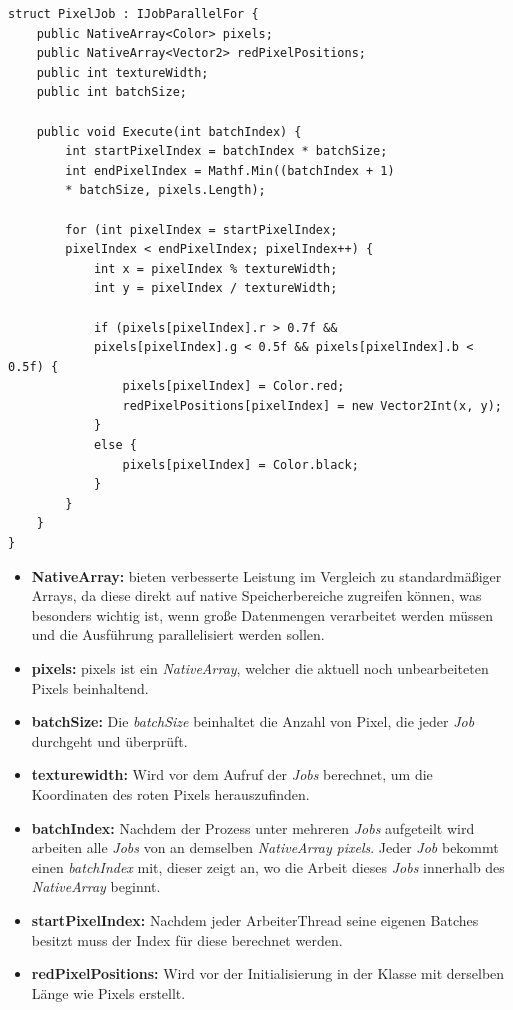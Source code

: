 \begin{lstlisting}[style=csharp, caption={Rote Pixel suche}, label=code:PixelJob]
struct PixelJob : IJobParallelFor {
    public NativeArray<Color> pixels;
    public NativeArray<Vector2> redPixelPositions;
    public int textureWidth;
    public int batchSize;

    public void Execute(int batchIndex) {
        int startPixelIndex = batchIndex * batchSize;
        int endPixelIndex = Mathf.Min((batchIndex + 1)
        * batchSize, pixels.Length);

        for (int pixelIndex = startPixelIndex;
        pixelIndex < endPixelIndex; pixelIndex++) {
            int x = pixelIndex % textureWidth;
            int y = pixelIndex / textureWidth;

            if (pixels[pixelIndex].r > 0.7f &&
            pixels[pixelIndex].g < 0.5f && pixels[pixelIndex].b < 0.5f) {
                pixels[pixelIndex] = Color.red;
                redPixelPositions[pixelIndex] = new Vector2Int(x, y);
            }
            else {
                pixels[pixelIndex] = Color.black;
            }
        }
    }
}
\end{lstlisting}
\begin{itemize}
    \item \textbf{NativeArray:} bieten verbesserte Leistung im Vergleich zu standardmäßiger Arrays, da diese direkt auf native Speicherbereiche zugreifen können, was besonders wichtig ist, wenn große Datenmengen verarbeitet werden müssen und die Ausführung parallelisiert werden sollen.
    \item \textbf{pixels:} pixels ist ein \textit{NativeArray}, welcher die aktuell noch unbearbeiteten Pixels beinhaltend.
    \item \textbf{batchSize:} Die \textit{batchSize} beinhaltet die Anzahl von Pixel, die jeder \textit{Job} durchgeht und überprüft.
    \item \textbf{texturewidth:} Wird vor dem Aufruf der \textit{Jobs} berechnet, um die Koordinaten des roten Pixels herauszufinden.
    \item \textbf{batchIndex:} Nachdem der Prozess unter mehreren \textit{Jobs} aufgeteilt wird arbeiten alle \textit{Jobs} von an demselben \textit{NativeArray} \textit{pixels}. Jeder \textit{Job} bekommt einen \textit{batchIndex} mit, dieser zeigt an, wo die Arbeit dieses \textit{Jobs} innerhalb des \textit{NativeArray} beginnt.
    \item \textbf{startPixelIndex:} Nachdem jeder ArbeiterThread seine eigenen Batches besitzt muss der Index für diese berechnet werden.
    \item \textbf{redPixelPositions:} Wird vor der Initialisierung in der Klasse mit derselben Länge wie Pixels erstellt.
\end{itemize}


